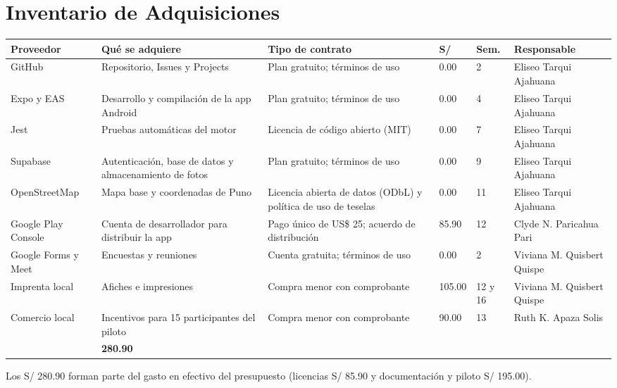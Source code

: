 \documentclass[11pt,a4paper]{article}
\begin{document}
\section{Inventario de Adquisiciones}
{\footnotesize
\setlength{\tabcolsep}{3.5pt}
\noindent\begin{tabularx}{\textwidth}{@{}P{2.4cm} L P{3.6cm} Q{1.2cm} C{1.0cm} P{2.5cm}@{}}
\toprule
{}
\textbf{Proveedor} & \textbf{Qué se adquiere} & \textbf{Tipo de contrato} & \textbf{S/} & \textbf{Sem.} & \textbf{Responsable} \\
\midrule
GitHub & Repositorio, Issues y Projects & Plan gratuito; términos de uso & 0.00 & 2 & Eliseo Tarqui Ajahuana \\
Expo y EAS & Desarrollo y compilación de la app Android & Plan gratuito; términos de uso & 0.00 & 4 & Eliseo Tarqui Ajahuana \\
Jest & Pruebas automáticas del motor & Licencia de código abierto (MIT) & 0.00 & 7 & Eliseo Tarqui Ajahuana \\
Supabase & Autenticación, base de datos y almacenamiento de fotos & Plan gratuito; términos de uso & 0.00 & 9 & Eliseo Tarqui Ajahuana \\
OpenStreetMap & Mapa base y coordenadas de Puno & Licencia abierta de datos (ODbL) y política de uso de teselas & 0.00 & 11 & Eliseo Tarqui Ajahuana \\
Google Play Console & Cuenta de desarrollador para distribuir la app & Pago único de US\$ 25; acuerdo de distribución & 85.90 & 12 & Clyde N. Paricahua Pari \\
Google Forms y Meet & Encuestas y reuniones & Cuenta gratuita; términos de uso & 0.00 & 2 & Viviana M. Quisbert Quispe \\
Imprenta local & Afiches e impresiones & Compra menor con comprobante & 105.00 & 12 y 16 & Viviana M. Quisbert Quispe \\
Comercio local & Incentivos para 15 participantes del piloto & Compra menor con comprobante & 90.00 & 13 & Ruth K. Apaza Solis \\
\midrule
{} & \textbf{280.90} & & \\
\bottomrule
\end{tabularx}
}

\vspace{0.1cm}
\noindent Los S/ 280.90 forman parte del gasto en efectivo del presupuesto (licencias S/ 85.90 y documentación y piloto S/ 195.00).
\end{document}
